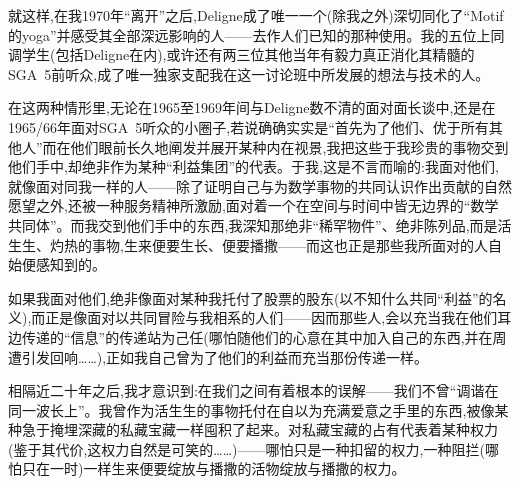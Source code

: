 就这样,在我1970年“离开”之后,Deligne成了唯一一个(除我之外)深切同化了“Motif的yoga”并感受其全部深远影响的人——去作人们已知的那种使用。我的五位上同调学生(包括Deligne在内),或许还有两三位其他当年有毅力真正消化其精髓的SGA~5前听众,成了唯一独家支配我在这一讨论班中所发展的想法与技术的人。

在这两种情形里,无论在1965至1969年间与Deligne数不清的面对面长谈中,还是在1965/66年面对SGA~5听众的小圈子,若说确确实实是“首先为了他们、优于所有其他人”而在他们眼前长久地阐发并展开某种内在视景,我把这些于我珍贵的事物交到他们手中,却绝非作为某种“利益集团”的代表。于我,这是不言而喻的:我面对他们,就像面对同我一样的人——除了证明自己与为数学事物的共同认识作出贡献的自然愿望之外,还被一种服务精神所激励,面对着一个在空间与时间中皆无边界的“数学共同体”。\dmark{}而我交到他们手中的东西,我深知那绝非“稀罕物件”、绝非陈列品,而是活生生、灼热的事物,生来便要生长、便要播撒——而这也正是那些我所面对的人自始便感知到的。

如果我面对他们,绝非像面对某种我托付了股票的股东(以不知什么共同“利益”的名义),而正是像面对以共同冒险与我相系的人们——因而那些人,会以充当我在他们耳边传递的“信息”的传递站为己任(哪怕随他们的心意在其中加入自己的东西,并在周遭引发回响……),正如我自己曾为了他们的利益而充当那份传递一样。

相隔近二十年之后,我才意识到:在我们之间有着根本的误解——我们不曾“调谐在同一波长上”。我曾作为活生生的事物托付在自以为充满爱意之手里的东西,被像某种急于掩埋深藏的私藏宝藏一样囤积了起来。对私藏宝藏的占有代表着某种权力(鉴于其代价,这权力自然是可笑的……)——哪怕只是一种扣留的权力,一种阻拦(哪怕只在一时)一样生来便要绽放与播撒的活物绽放与播撒的权力。

